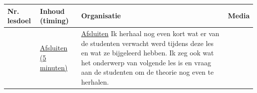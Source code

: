 \begin{landscape}
%	
	
	

\begin{tabularx}{1.56\textwidth}{|p{1.5cm}|p{6cm}|X|p{4cm}|}
	\hline
	\textbf{Nr. lesdoel } & \textbf{Inhoud (timing)}  & \textbf{Organisatie } & \textbf{Media } \\ \hline
	&\underline{Afsluiten (5 minuten)}\newline 
	&  \underline{Afsluiten}\newline
	Ik herhaal nog even kort wat er van de studenten verwacht werd tijdens deze les en wat ze bijgeleerd hebben. Ik zeg ook wat het onderwerp van volgende les is en vraag aan de studenten om de theorie nog even te herhalen.
	& 
	\\ \hline
\end{tabularx}
	
	
	
	
\end{landscape}



